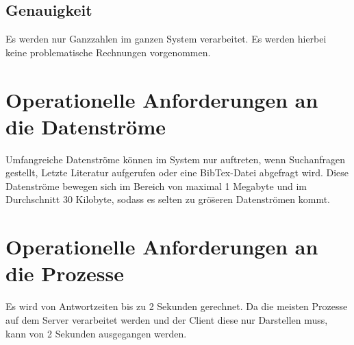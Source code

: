 \subsection{Genauigkeit}
Es werden nur Ganzzahlen im ganzen System verarbeitet. Es werden hierbei keine problematische Rechnungen vorgenommen.

\section{Operationelle Anforderungen an die Datenströme}
Umfangreiche Datenstr\"ome k\"onnen im System nur auftreten, wenn Suchanfragen gestellt, Letzte Literatur aufgerufen oder eine BibTex-Datei abgefragt wird. 
Diese Datenstr\"ome bewegen sich im Bereich von maximal 1 Megabyte und im Durchschnitt 30 Kilobyte, sodass es selten
zu gr\"o\"seren Datenstr\"omen kommt.


\section{Operationelle Anforderungen an die Prozesse}
Es wird von Antwortzeiten bis zu 2 Sekunden gerechnet. Da die meisten Prozesse auf dem Server verarbeitet werden und der Client diese nur Darstellen muss, 
kann von 2 Sekunden ausgegangen werden. 

